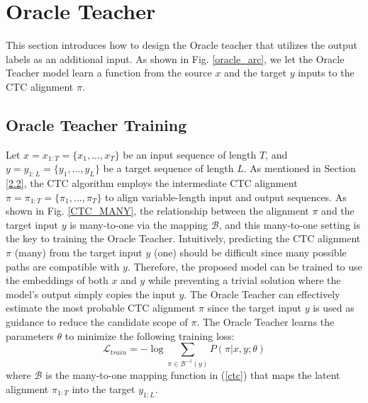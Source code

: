 \documentclass[journal]{IEEEtran}
\begin{document}
\section{Oracle Teacher}
This section introduces how to design the Oracle teacher that utilizes the output labels as an additional input.
As shown in Fig. \ref{oracle_arc}, we let the Oracle Teacher model learn a function from the source $x$ and the target $y$ inputs to the CTC alignment $\pi$.

\subsection{Oracle Teacher Training}
Let $x=x_{1:T}=\{x_{1},...,x_{T}\}$ be an input sequence of length $T$, and $y=y_{1:L}=\{y_{1},...,y_{L}\}$ be a target sequence of length $L$.
As mentioned in Section \ref{2.2},  the CTC algorithm employs the intermediate CTC alignment $\pi=\pi_{1:T}=\{\pi_{1},...,\pi_{T}\}$ to align variable-length input and output sequences.
As shown in Fig. \ref{CTC_MANY}, the relationship between the alignment $\pi$ and the target input $y$ is many-to-one via the mapping $\mathcal{B}$, and this many-to-one setting is the key to training the Oracle Teacher.
Intuitively, predicting the CTC alignment $\pi$ (many) from the target input $y$ (one) should be difficult since many possible paths are compatible with $y$.
Therefore, the proposed model can be trained to use the embeddings of both $x$ and $y$ while preventing a trivial solution where the model's output simply copies the input $y$.
The Oracle Teacher can effectively estimate the most probable CTC alignment $\pi$ since the target input $y$ is used as guidance to reduce the candidate scope of $\pi$.
The Oracle Teacher learns the parameters $\theta$ to minimize the following training loss:
\begin{equation}
\label{oracle}
\mathcal{L}_{train} = -\log\sum_{\pi \in \mathcal{B}^{-1}(y)}P(\pi|x,y;\theta)
\end{equation}
where $\mathcal{B}$ is the many-to-one mapping function in (\ref{ctc}) that maps the latent alignment $\pi_{1:T}$ into the target $y_{1:L}$.

\end{document}
